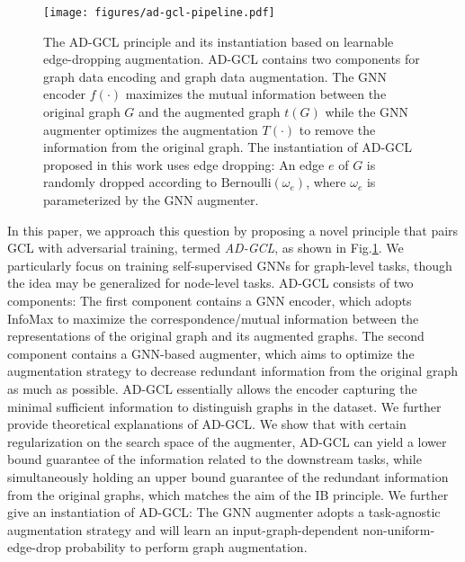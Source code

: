 \begin{figure}
    \centering
    \texttt{[image: figures/ad-gcl-pipeline.pdf]}
    \vspace{-4mm}
    \caption{\small{The AD-GCL principle and its instantiation based on learnable edge-dropping augmentation. AD-GCL contains two components for graph data encoding and graph data augmentation. The GNN encoder $f(\cdot)$ maximizes the mutual information between the original graph $G$ and the augmented graph $t(G)$ while the GNN augmenter optimizes the augmentation  $T(\cdot)$ to remove the information from the original graph. The instantiation of AD-GCL proposed in this work uses edge dropping: An edge $e$ of $G$ is randomly dropped according to $\text{Bernoulli}(\omega_e)$, where $\omega_e$ is parameterized by the GNN augmenter. }}%
    \label{fig:ad-gcl-pipeline}
    \vspace{-3mm}
\end{figure}

In this paper, we approach this question by proposing a novel principle that pairs GCL with adversarial training, termed \emph{AD-GCL}, as shown in Fig.\ref{fig:ad-gcl-pipeline}. We particularly focus on training self-supervised GNNs for graph-level tasks, though the idea may be generalized for node-level tasks. AD-GCL consists of two components: The first component contains a GNN encoder, which adopts InfoMax to maximize the correspondence/mutual information between the representations of the original graph and its augmented graphs. The second component contains a GNN-based augmenter, which aims to optimize the augmentation strategy to decrease redundant information from the original graph as much as possible. AD-GCL essentially allows the encoder capturing the minimal sufficient information to distinguish graphs in the dataset. We further provide theoretical explanations of AD-GCL. We show that with certain regularization on the search space of the augmenter, AD-GCL can yield a lower bound guarantee of the information related to the downstream tasks, while simultaneously holding an upper bound guarantee of the redundant information from the original graphs, which matches the aim of the IB principle. We further give an instantiation of AD-GCL: The GNN augmenter adopts a task-agnostic augmentation strategy and will learn an input-graph-dependent non-uniform-edge-drop probability to perform graph augmentation.


